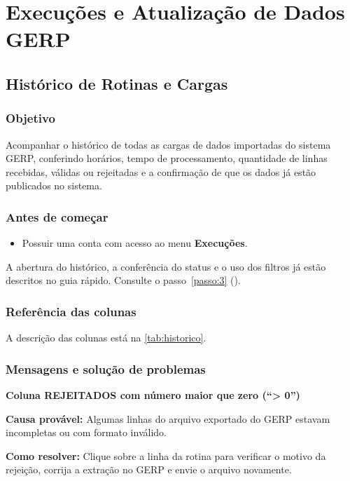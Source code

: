 \chapter{Execuções e Atualização de Dados GERP}

\label{cap:manual-3}

\section{Histórico de Rotinas e Cargas}

\subsection*{Objetivo}

Acompanhar o histórico de todas as cargas de dados importadas do sistema GERP, conferindo horários, tempo de processamento, quantidade de linhas recebidas, válidas ou rejeitadas e a confirmação de que os dados já estão publicados no sistema.\par

\subsection*{Antes de começar}

\begin{itemize}
\item Possuir uma conta com acesso ao menu \textbf{Execuções}.
\end{itemize}

\begin{remark}[info]
A abertura do histórico, a conferência do status e o uso dos filtros já estão descritos no guia rápido. Consulte o passo~\ref{passo:3} ().
\end{remark}

\Needspace{160pt}

\subsection*{Referência das colunas}

A descrição das colunas está na \autoref{tab:historico}.

\subsection*{Mensagens e solução de problemas}

\begin{remark}
\textbf{Coluna REJEITADOS com número maior que zero (``> 0'')}\par
\textbf{Causa provável:} Algumas linhas do arquivo exportado do GERP estavam incompletas ou com formato inválido.\par
\textbf{Como resolver:} Clique sobre a linha da rotina para verificar o motivo da rejeição, corrija a extração no GERP e envie o arquivo novamente.
\end{remark}

